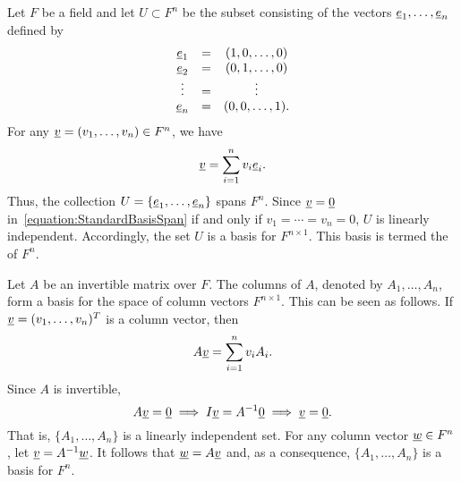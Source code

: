 \begin{example}
Let $F$ be a field and let $U \subset F^n$ be the subset consisting of the vectors $\underline{e}_1, \ldots, \underline{e}_n$ defined by
\begin{equation*}
\begin{array}{ccc}
\underline{e}_1 & = & (1, 0, \ldots, 0) \\
\underline{e}_2 & = & (0, 1, \ldots, 0) \\
\vdots & = & \vdots \\
\underline{e}_n & = & (0, 0, \ldots, 1).
\end{array}
\end{equation*}
For any $\underline{v} = (v_1, \ldots, v_n) \in F^n$, we have
\begin{equation} \label{equation:StandardBasisSpan}
\underline{v} = \sum_{i=1}^n v_i \underline{e}_i.
\end{equation}
Thus, the collection $U = \left\{ \underline{e}_1, \ldots, \underline{e}_n \right\}$ spans $F^n$.
Since $\underline{v} = \underline{0}$ in~\eqref{equation:StandardBasisSpan} if and only if $v_1 = \cdots = v_n = 0$, $U$ is linearly independent.
Accordingly, the set $U$ is a basis for $F^{n \times 1}$.
This basis is termed the  of $F^n$.
\end{example}

\begin{example}
Let $A$ be an invertible matrix over $F$.
The columns of $A$, denoted by $A_1, \ldots, A_n$, form a basis for the space of column vectors $F^{n \times 1}$.
This can be seen as follows.
If $\underline{v} = (v_1, \ldots, v_n)^T$ is a column vector, then
\begin{equation*}
A \underline{v} = \sum_{i=1}^n v_i A_i.
\end{equation*}
Since $A$ is invertible,
\begin{equation*}
A \underline{v} = \underline{0} \implies I \underline{v} = A^{-1} \underline{0} \implies \underline{v} = \underline{0}.
\end{equation*}
That is, $\{ A_1, \ldots, A_n \}$ is a linearly independent set.
For any column vector $\underline{w} \in F^n$, let $\underline{v} = A^{-1} \underline{w}$.
It follows that $\underline{w} = A \underline{v}$ and, as a consequence, $\{ A_1, \ldots, A_n \}$ is a basis for $F^n$.
\end{example}

